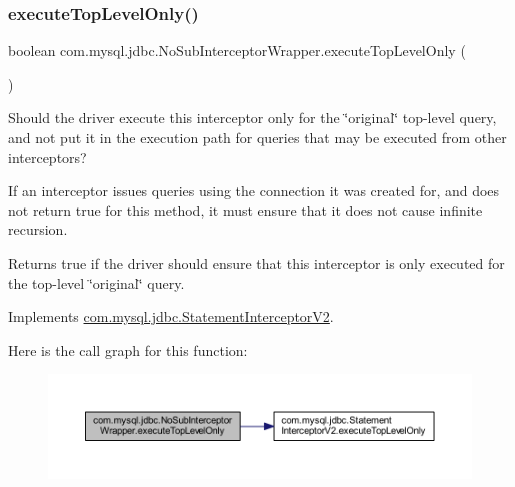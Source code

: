 \subsubsection{\texorpdfstring{execute\+Top\+Level\+Only()}{executeTopLevelOnly()}}
{\footnotesize\ttfamily boolean com.\+mysql.\+jdbc.\+No\+Sub\+Interceptor\+Wrapper.\+execute\+Top\+Level\+Only (\begin{DoxyParamCaption}{ }\end{DoxyParamCaption})}

Should the driver execute this interceptor only for the \char`\"{}original\char`\"{} top-\/level query, and not put it in the execution path for queries that may be executed from other interceptors?

If an interceptor issues queries using the connection it was created for, and does not return {\ttfamily true} for this method, it must ensure that it does not cause infinite recursion.

\begin{DoxyReturn}{Returns}
true if the driver should ensure that this interceptor is only executed for the top-\/level \char`\"{}original\char`\"{} query. 
\end{DoxyReturn}


Implements \mbox{\hyperlink{interfacecom_1_1mysql_1_1jdbc_1_1_statement_interceptor_v2_a36f03c5f5b1755d48549862d5b6c627f}{com.\+mysql.\+jdbc.\+Statement\+Interceptor\+V2}}.

Here is the call graph for this function\+:
\nopagebreak
\begin{figure}[H]
\begin{center}
\leavevmode
\includegraphics[width=350pt]{classcom_1_1mysql_1_1jdbc_1_1_no_sub_interceptor_wrapper_a3688c515a37ae2f36b8f59ae51304ac4_cgraph}
\end{center}
\end{figure}
\mbox{\label{classcom_1_1mysql_1_1jdbc_1_1_no_sub_interceptor_wrapper_a7272676b9081fbf866a494f4d35b3a6d}} 
